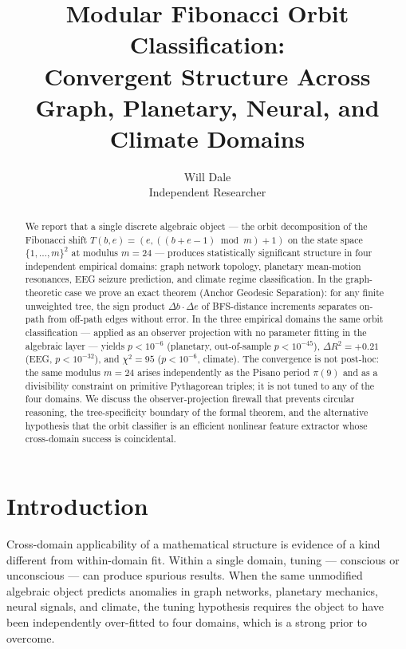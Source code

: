 \documentclass[11pt]{article}
\begin{document}
\title{Modular Fibonacci Orbit Classification:\\
Convergent Structure Across Graph, Planetary, Neural, and Climate Domains}
\author{Will Dale\\
\small Independent Researcher}
\date{}
\maketitle

\begin{abstract}
We report that a single discrete algebraic object --- the orbit decomposition of the
Fibonacci shift $T(b,e)=(e,((b+e-1)\bmod m)+1)$ on the state space
$\{1,\dots,m\}^2$ at modulus $m=24$ --- produces statistically significant structure
in four independent empirical domains: graph network topology, planetary mean-motion
resonances, EEG seizure prediction, and climate regime classification.
In the graph-theoretic case we prove an exact theorem (Anchor Geodesic Separation):
for any finite unweighted tree, the sign product $\Delta b \cdot \Delta e$ of
BFS-distance increments separates on-path from off-path edges without error.
In the three empirical domains the same orbit classification --- applied as an
observer projection with no parameter fitting in the algebraic layer --- yields
$p < 10^{-6}$ (planetary, out-of-sample $p < 10^{-45}$), $\Delta R^2 = +0.21$
(EEG, $p < 10^{-32}$), and $\chi^2 = 95$ ($p < 10^{-6}$, climate).
The convergence is not post-hoc: the same modulus $m=24$ arises independently
as the Pisano period $\pi(9)$ and as a divisibility constraint on primitive
Pythagorean triples; it is not tuned to any of the four domains.
We discuss the observer-projection firewall that prevents circular reasoning,
the tree-specificity boundary of the formal theorem, and the alternative
hypothesis that the orbit classifier is an efficient nonlinear feature extractor
whose cross-domain success is coincidental.
\end{abstract}

\section{Introduction}\label{sec:intro}

Cross-domain applicability of a mathematical structure is evidence of a kind
different from within-domain fit.  Within a single domain, tuning --- conscious
or unconscious --- can produce spurious results.  When the same unmodified
algebraic object predicts anomalies in graph networks, planetary mechanics,
neural signals, and climate, the tuning hypothesis requires the object to have
been independently over-fitted to four domains, which is a strong prior to overcome.
\end{document}
